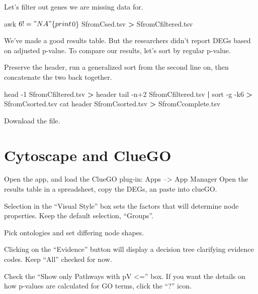 \documentclass[
]{book}
\newenvironment{Shaded}{\begin{snugshade}}{\end{snugshade}}
\newcommand{\AttributeTok}[1]{\textcolor[rgb]{0.77,0.63,0.00}{#1}}
\newcommand{\FunctionTok}[1]{\textcolor[rgb]{0.00,0.00,0.00}{#1}}
\newcommand{\KeywordTok}[1]{\textcolor[rgb]{0.13,0.29,0.53}{\textbf{#1}}}
\newcommand{\NormalTok}[1]{#1}
\newcommand{\OperatorTok}[1]{\textcolor[rgb]{0.81,0.36,0.00}{\textbf{#1}}}
\newcommand{\StringTok}[1]{\textcolor[rgb]{0.31,0.60,0.02}{#1}}
\begin{document}
Let's filter out genes we are missing data for.

\begin{Shaded}
\begin{Highlighting}[]
\FunctionTok{awk} \StringTok{\textquotesingle{}$6 != "NA" \{print $0\}\textquotesingle{}}\NormalTok{ SfromCsed.tsv  }\OperatorTok{\textgreater{}}\NormalTok{ SfromCfiltered.tsv}
\end{Highlighting}
\end{Shaded}

We've made a good results table. But the researchers didn't report DEGs based on adjusted p-value. To compare our results, let's sort by regular p-value.

Preserve the header, run a generalized sort from the second line on, then concatenate the two back together.

\begin{Shaded}
\begin{Highlighting}[]
\FunctionTok{head} \AttributeTok{{-}1}\NormalTok{ SfromCfiltered.tsv }\OperatorTok{\textgreater{}}\NormalTok{ header}
\FunctionTok{tail} \AttributeTok{{-}n+2}\NormalTok{ SfromCfiltered.tsv }\KeywordTok{|} \FunctionTok{sort} \AttributeTok{{-}g} \AttributeTok{{-}k6} \OperatorTok{\textgreater{}}\NormalTok{ SfromCsorted.tsv}
\FunctionTok{cat}\NormalTok{ header SfromCsorted.tsv }\OperatorTok{\textgreater{}}\NormalTok{ SfromCcomplete.tsv}
\end{Highlighting}
\end{Shaded}

Download the file.

\hypertarget{cytoscape-and-cluego}{%
\section{Cytoscape and ClueGO}\label{cytoscape-and-cluego}}

Open the app, and load the ClueGO plug-in: Apps --\textgreater{} App Manager
Open the results table in a spreadsheet, copy the DEGs, an paste into clueGO.

Selection in the ``Visual Style'' box sets the factors that will determine node properties. Keep the default selection, ``Groups''.

Pick ontologies and set differing node shapes.

Clicking on the ``Evidence'' button will display a decision tree clarifying evidence codes. Keep ``All'' checked for now.

Check the ``Show only Pathways with pV \textless='' box. If you want the details on how p-values are calculated for GO terms, click the ``?'' icon.
\end{document}
